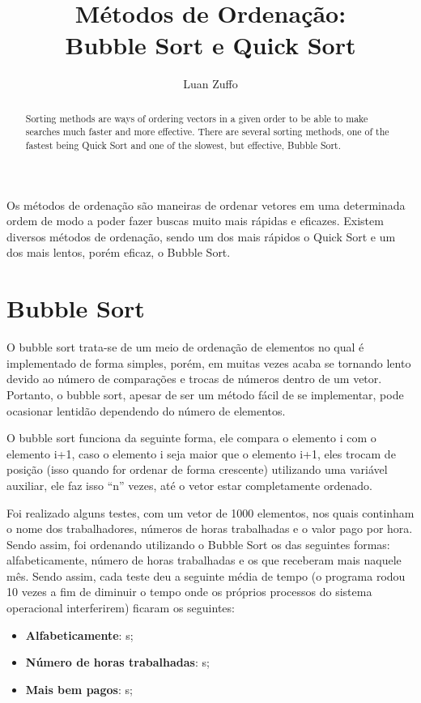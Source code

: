 \documentclass[12pt]{article}
\title{Métodos de Ordenação: \\ Bubble Sort e Quick Sort}
\author{\x Luan Zuffo\inst{1}}
\begin{document}
 

\maketitle

\begin{abstract}
  Sorting methods are ways of ordering vectors in a given
  order to be able to make searches much faster and more effective. There are several
  sorting methods, one of the fastest being Quick Sort and one of the slowest,
  but effective, Bubble Sort.
\end{abstract}
     
\begin{resumo} 
  Os métodos de ordenação são maneiras de ordenar vetores em uma determinada
  ordem de modo a poder fazer buscas muito mais rápidas e eficazes. Existem diversos
  métodos de ordenação, sendo um dos mais rápidos o Quick Sort e um dos mais lentos, 
  porém eficaz, o Bubble Sort.
\end{resumo}

\section{Bubble Sort} 

O bubble sort trata-se de um meio de ordenação de elementos no qual é implementado de forma simples, porém, em muitas vezes acaba se tornando lento devido ao número de comparações e trocas de números dentro de um vetor. Portanto, o bubble sort, apesar de ser um método fácil de se implementar, pode ocasionar lentidão dependendo do número de elementos.

O bubble sort funciona da seguinte forma, ele compara o elemento i com o elemento i+1, caso o elemento i seja maior que o elemento i+1, eles trocam de posição (isso quando for ordenar de forma crescente) utilizando uma variável auxiliar, ele faz isso “n” vezes, até o vetor estar completamente ordenado.

Foi realizado alguns testes, com um vetor de 1000 elementos, nos quais continham o nome dos trabalhadores, números de horas trabalhadas e o valor pago por hora. Sendo assim, foi ordenando utilizando o Bubble Sort os das seguintes formas: alfabeticamente, número de horas trabalhadas e os que receberam mais naquele mês. Sendo assim, cada teste deu a seguinte média de tempo (o programa rodou 10 vezes a fim de diminuir o tempo onde os próprios processos do sistema operacional interferirem) ficaram os seguintes:
\begin{itemize}
  \item \textbf{Alfabeticamente}: \alfaBubble s;
  \item \textbf{Número de horas trabalhadas}: \horasBubble s;
  \item \textbf{Mais bem pagos}: \pagosBubble s;
\end{itemize}
\end{document}
